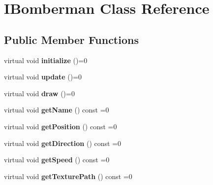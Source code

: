 \hypertarget{class_i_bomberman}{\section{I\+Bomberman Class Reference}
\label{class_i_bomberman}
}
\subsection*{Public Member Functions}
\begin{DoxyCompactItemize}
\item 
\hypertarget{class_i_bomberman_a5c575efb618a30236fdb8f1fc3cc7cf3}{virtual void {\bfseries initialize} ()=0}\label{class_i_bomberman_a5c575efb618a30236fdb8f1fc3cc7cf3}

\item 
\hypertarget{class_i_bomberman_a3ef97ff8276fa1fe9a84744651a2fe29}{virtual void {\bfseries update} ()=0}\label{class_i_bomberman_a3ef97ff8276fa1fe9a84744651a2fe29}

\item 
\hypertarget{class_i_bomberman_a01833c13df3cdd011410351441804d89}{virtual void {\bfseries draw} ()=0}\label{class_i_bomberman_a01833c13df3cdd011410351441804d89}

\item 
\hypertarget{class_i_bomberman_a91ae1620de14f815b297a782baaf2dd9}{virtual void {\bfseries get\+Name} () const =0}\label{class_i_bomberman_a91ae1620de14f815b297a782baaf2dd9}

\item 
\hypertarget{class_i_bomberman_a107bd32946a7a324bd1e947eedd5f22d}{virtual void {\bfseries get\+Position} () const =0}\label{class_i_bomberman_a107bd32946a7a324bd1e947eedd5f22d}

\item 
\hypertarget{class_i_bomberman_ad5c41e6510a176074e608b394715041c}{virtual void {\bfseries get\+Direction} () const =0}\label{class_i_bomberman_ad5c41e6510a176074e608b394715041c}

\item 
\hypertarget{class_i_bomberman_a870e4433b09ab72c0abcc0523800dc06}{virtual void {\bfseries get\+Speed} () const =0}\label{class_i_bomberman_a870e4433b09ab72c0abcc0523800dc06}

\item 
\hypertarget{class_i_bomberman_a1cfbff1fa2eeab379ca82b1f2cf65d31}{virtual void {\bfseries get\+Texture\+Path} () const =0}\label{class_i_bomberman_a1cfbff1fa2eeab379ca82b1f2cf65d31}


\end{DoxyCompactItemize}
